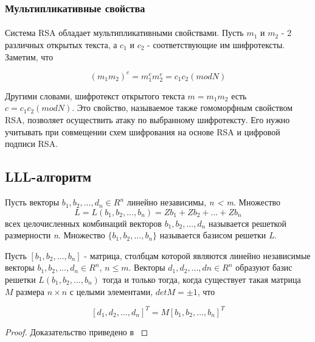 \subsubsection{Мультипликативные свойства}

  \paragraph{} Система RSA обладает мультипликативными свойствами. Пусть \textit{{$m_1$}} и \textit{{$m_2$}} - 2 различных открытых текста, а \textit{{$c_1$}}
  и \textit{{$c_2$}} - соответствующие им шифротексты. Заметим, что
  
    \begin{equation}
      \textit{{$(m_1 m_2)^e = m_1^e m_2^e = c_1 c_2 (mod N)$}}
    \end{equation}

  Другими словами, шифротекст открытого текста \textit{{$m = m_1 m_2$}} есть \textit{{$c = c_1 c_2 (mod N)$}}. Это свойство, называемое также гомоморфным 
  свойством  RSA, позволяет осуществить атаку по выбранному шифротексту. Его нужно учитывать при совмещении схем шифрования на основе RSA и цифровой подписи
  RSA.

\subsection{LLL-алгоритм}

  \begin{definition}
    Пусть векторы \textit{{$ b_1, b_2, \dots, d_n \in R^n$}} линейно независимы, \textit{n < m}. Множество 
      \begin{equation}
	\textit{{$L=L(b_1, b_2, \dots, b_n) = Zb_1 + Zb_2 + \dots + Zb_n$}}
      \end{equation}    
    всех целочисленных комбинаций векторов \textit{{$ b_1, b_2, \dots, d_n$}} называется решеткой размерности \textit{n}. Множество
    \textit{{$ \{b_1, b_2, \dots, b_n \} $}} называется базисом решетки \textit{L}.
  \end{definition}
  
  \begin{theorem}
    Пусть {$[b_1, b_2, \dots, b_n]$} - матрица, столбцам которой являются линейно независимые векторы {$ b_1, b_2, \dots, d_n \in R^n$}, {$n \le m$}.
    Векторы \textit{{$ d_1, d_2, \dots, dn \in R^n$}} образуют базис решетки {$L(b_1, b_2, \dots, b_n)$} тогда и только тогда, когда существует такая матрица
    {$M$} размера {$n \times n$} с целыми элементами, {$detM = \pm 1$}, что
    
      \begin{equation}
       \textit{{$[d_1, d_2, \dots, d_n]^T = M [b_1, b_2, \dots, b_n]^T$}}
      \end{equation}

      \begin{proof}
	Доказательство приведено в \cite[Глава 8.2, страница 260]{mah06}
      \end{proof}
  \end{theorem}  


